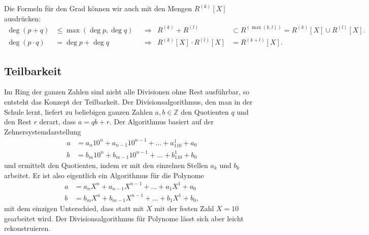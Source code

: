 Die Formeln für den Grad können wir auch mit den Mengen $R^{(k)}[X]$
ausdrücken:
\begin{align*}
\deg (p+q) &\le \max(\deg p, \deg q)
&&\Rightarrow&
R^{(k)}+R^{(l)}
&\subset R^{(\max(k,l))}
=
R^{(k)}[X] \cup R^{(l)}[X].
\\
\deg (p\cdot q)&=\deg p+\deg q
&&\Rightarrow&
R^{(k)}[X] \cdot R^{(l)}[X]
&=
R^{(k+l)}[X].
\end{align*}


%
%
\subsection{Teilbarkeit
\label{buch:subsection:polynome:teilbarkeit}}
Im Ring der ganzen Zahlen sind nicht alle Divisionen ohne Rest
ausführbar, so entsteht das Konzept der Teilbarkeit.
Der Divisionsalgorithmus, den man in der Schule lernt, liefert
%
zu beliebigen ganzen Zahlen $a,b\in\mathbb{Z}$ den Quotienten
$q$ und den Rest $r$ derart, dass $a=qb+r$.
Der Algorithmus basiert auf der Zehnersystemdarstellung 
\begin{align*}
a &= a_n10^{n} + a_{n-1}10^{n-1} + \dots + a_110^{1} + a_0
\\
b &= b_m10^{n} + b_{m-1}10^{n-1} + \dots + b_110^{1} + b_0
\end{align*}
und ermittelt den Quotienten, indem er mit den einzelnen Stellen
$a_k$ und $b_k$ arbeitet.
Er ist also eigentlich ein Algorithmus für die Polynome
\begin{align*}
a &= a_nX^{n} + a_{n-1}X^{n-1} + \dots + a_1X^{1} + a_0
\\
b &= b_mX^{n} + b_{m-1}X^{n-1} + \dots + b_1X^{1} + b_0,
\end{align*}
mit dem einzigen Unterschied, dass statt mit $X$ mit der festen Zahl $X=10$
gearbeitet wird.
Der Divisionsalgorithmus für Polynome lässt sich aber leicht
rekonstruieren.

